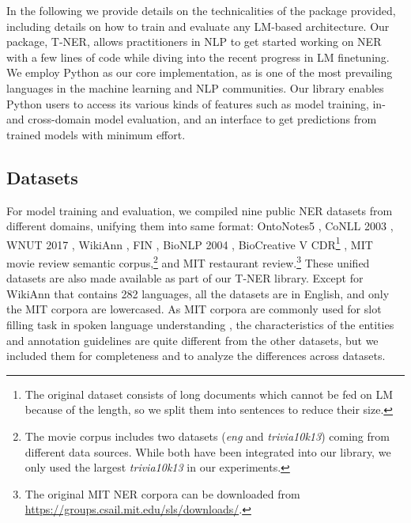 \documentclass[11pt,a4paper]{article}
\begin{document}
In the following we provide details on the technicalities of the package provided, including details on how to train and evaluate any LM-based architecture. Our package, T-NER, allows practitioners in NLP to get started working on NER with a few lines of code while diving into the recent progress in LM finetuning. We employ Python as our core implementation, as is one of the most prevailing languages in the machine learning and NLP communities. Our library enables Python users to access its various kinds of features such as model training, in- and cross-domain model evaluation, and an interface to get predictions from trained models with minimum effort.




\subsection{Datasets}
\label{ssec:dataset}



For model training and evaluation, we compiled nine public NER datasets from different domains, unifying them into same format:
OntoNotes5 \citep{hovy-etal-2006-ontonotes},
CoNLL 2003 \citep{tjong-kim-sang-de-meulder-2003-introduction},
WNUT 2017 \citep{derczynski-etal-2017-results},
WikiAnn \citep{pan-etal-2017-cross},
FIN \citep{salinas-alvarado-etal-2015-domain},
BioNLP 2004 \citep{collier-kim-2004-introduction},
BioCreative V CDR\footnote{The original dataset consists of long documents which cannot be fed on LM because of the length, so we split them into sentences to reduce their size.} \citep{wei2015overview},
MIT movie review semantic corpus,\footnote{
The movie corpus includes two datasets ({\it eng} and {\it trivia10k13}) coming from different data sources. While both have been integrated into our library, we only used the largest {\it trivia10k13} in our experiments. 
}
and MIT restaurant review.\footnote{
The original MIT NER corpora can be downloaded from \url{https://groups.csail.mit.edu/sls/downloads/}.} These unified datasets are also made available as part of our T-NER library. Except for WikiAnn that contains 282 languages, all the datasets are in English, and only the MIT corpora are lowercased.
As MIT corpora are commonly used for slot filling task in spoken language understanding 
\citep{liu2017multi}, the characteristics of the entities and annotation guidelines are quite different from the other datasets, but we included them for completeness and to analyze the differences across datasets.
\end{document}
